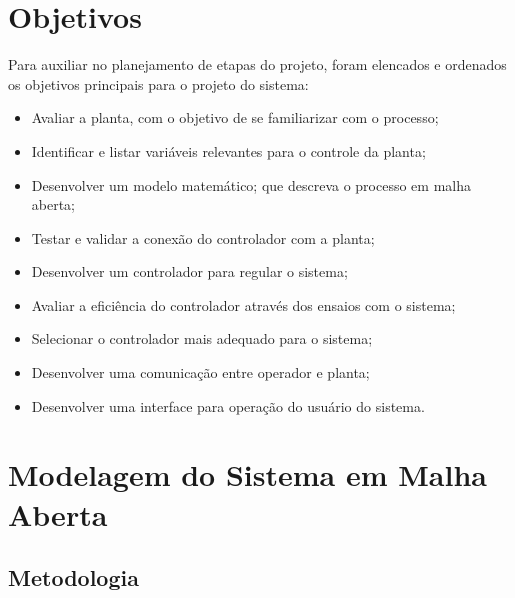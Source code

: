 \documentclass[
	article,			%
	11pt,				%
	oneside,			%
	a4paper,			%
	section=TITLE,		%
	english,			%
	brazil,				%
	sumario=tradicional
	]{abntex2}
\begin{document}
\newpage
\section{Objetivos}

Para auxiliar no planejamento de etapas do projeto, foram elencados e ordenados os objetivos principais para o projeto do sistema:
\begin{itemize}
    \item Avaliar a planta, com o objetivo de se familiarizar com o processo;
    \item Identificar e listar variáveis relevantes para o controle da planta;
    \item Desenvolver um modelo matemático;
    que descreva o processo em malha aberta;
    \item Testar e validar a conexão do controlador com a planta;
    \item Desenvolver um controlador para regular o sistema; 
    \item Avaliar a eficiência do controlador através dos ensaios com o sistema;
    \item Selecionar o controlador mais adequado para o sistema;
    \item Desenvolver uma comunicação entre operador e planta;
    \item Desenvolver uma interface para operação do usuário do sistema.
\end{itemize}

\newpage


\section{Modelagem do Sistema em Malha Aberta}
\subsection{Metodologia}

    
\end{document}
